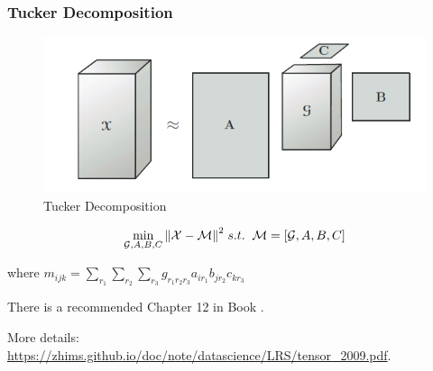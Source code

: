\documentclass[aspectratio=2516]{beamer}
\begin{document}
\begin{frame}
\frametitle{Tucker Decomposition}
\begin{figure}
	\centering
	\includegraphics[width=0.4\linewidth,height=0.15\linewidth]{fig6.png}
	\caption{Tucker Decomposition}
	\label{fig6} 
\end{figure}
\begin{equation}
\mathop {\min }\limits_{\mathcal{G},A,B,C} {\left\| {\mathcal{X} - \mathcal{M}} \right\|^2}\;s.t.\;\;\mathcal{M} = \left[{\mathcal{G},A,B,C} 
\right]
\notag 
\end{equation}
\begin{center}
	where ${m_{ijk}} = \sum\limits_{{r_1}} {\sum\limits_{{r_2}} {\sum\limits_{{r_3}} {{g_{{r_1}{r_2}{r_3}}}{a_{i{r_1}}}} } {b_{j{r_2}}}{c_{k{r_3}}}} $
\end{center}

\vspace{0.25cm}

{\tiny There is a recommended Chapter 12 in Book {\color{blue} \cite{p4}}}.

\vspace{0.25cm}

{\tiny More details:} {\color{blue} \tiny \url{https://zhims.github.io/doc/note/datascience/LRS/tensor_2009.pdf}}.
\end{frame}
\end{document}
